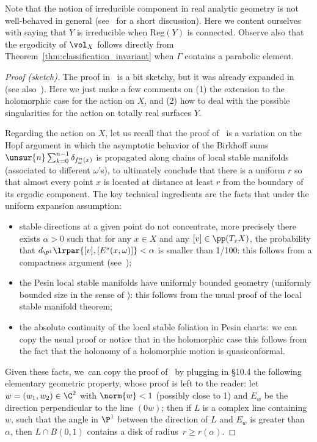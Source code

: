 Note that the notion of irreducible component in real analytic geometry is not well-behaved in general
(see~\cite[\S 5.1]{invariant} for a short discussion).
Here we content ourselves with saying that $Y$ is irreducible when $\mathrm{Reg}(Y)$ is connected.
Observe also that the ergodicity of
$\vol_X$ follows directly from Theorem~\ref{thm:classification_invariant} when $\Gamma$
contains a parabolic element.

\begin{proof}[Proof (sketch)]
The proof in~\cite{dolgopyat-krikorian} is a bit sketchy, but it was already
expanded in~\cite{liu_thesis, chung} (see also~\cite{zzhang}).
Here we just make a few comments on (1) the extension to the holomorphic case for the action on $X$,
and (2) how to deal with the possible singularities for the action on totally real surfaces $Y$.

Regarding the action on $X$, let us recall that the proof of~\cite{dolgopyat-krikorian} is a
variation on the Hopf argument in which the asymptotic behavior of the Birkhoff
sums $ \unsur{n}\sum_{k=0}^{n-1} \delta_{f_\omega^n(x)}$ is propagated along chains of
local stable manifolds (associated to different $\omega$'s), to ultimately conclude that there
is a uniform $r$ so that almost every point $x$
is located at distance at least $r$ from the boundary of its ergodic component.
The key technical ingredients are the facts that under the uniform expansion assumption:
\begin{itemize}
\item stable directions at a given point do not concentrate, more precisely there exists
$\alpha>0$ such that for any $x\in X$ and any $[v]\in \pp(T_x X)$, the probability that
$d_{\P^1}\lrpar{[v], [E^s(x,\omega) ]} <\alpha$ is smaller than 1/100: this follows from a compactness argument
(see~\cite[Prop.\,4.4.4]{liu_thesis});
\item the Pesin local stable manifolds have uniformly bounded geometry
(\eg uniformly bounded size in the sense of
\cite[\S 7.4]{stiffness}): this follows from the usual proof of the local stable manifold theorem;
\item the absolute continuity of the local stable foliation in Pesin charts: we can copy the usual proof
or notice that in the holomorphic case this follows from the fact that the holonomy of a holomorphic
motion is quasiconformal.
\end{itemize}
Given these facts, we~can copy the proof of~\cite{dolgopyat-krikorian} by plugging in \S 10.4
the following elementary geometric property, whose proof is left to the reader:
let $w = (w_1, w_2)\in \C^2$ with $\norm{w}<1$ (possibly close to 1)
and $E_w$ be the direction perpendicular to the line $(0w)$; then if
$L$ is a complex line containing $w$, such that the angle in $\P^1$
between the direction of
$L$ and $E_w$ is greater than $\alpha$, then $L\cap B(0, 1)$ contains a disk of radius~$r\geq r(\alpha)$.


\end{proof}
